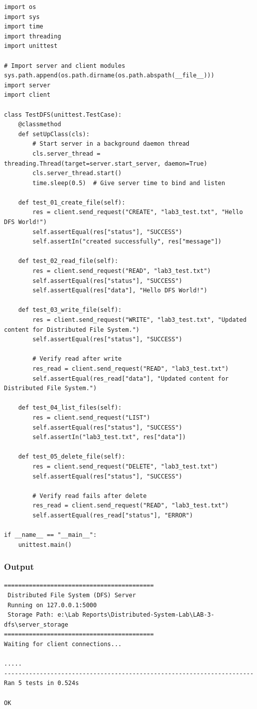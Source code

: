\documentclass[main]{subfiles}
\begin{document}
\begin{verbatim}
import os
import sys
import time
import threading
import unittest

# Import server and client modules
sys.path.append(os.path.dirname(os.path.abspath(__file__)))
import server
import client

class TestDFS(unittest.TestCase):
    @classmethod
    def setUpClass(cls):
        # Start server in a background daemon thread
        cls.server_thread = threading.Thread(target=server.start_server, daemon=True)
        cls.server_thread.start()
        time.sleep(0.5)  # Give server time to bind and listen

    def test_01_create_file(self):
        res = client.send_request("CREATE", "lab3_test.txt", "Hello DFS World!")
        self.assertEqual(res["status"], "SUCCESS")
        self.assertIn("created successfully", res["message"])

    def test_02_read_file(self):
        res = client.send_request("READ", "lab3_test.txt")
        self.assertEqual(res["status"], "SUCCESS")
        self.assertEqual(res["data"], "Hello DFS World!")

    def test_03_write_file(self):
        res = client.send_request("WRITE", "lab3_test.txt", "Updated content for Distributed File System.")
        self.assertEqual(res["status"], "SUCCESS")
        
        # Verify read after write
        res_read = client.send_request("READ", "lab3_test.txt")
        self.assertEqual(res_read["data"], "Updated content for Distributed File System.")

    def test_04_list_files(self):
        res = client.send_request("LIST")
        self.assertEqual(res["status"], "SUCCESS")
        self.assertIn("lab3_test.txt", res["data"])

    def test_05_delete_file(self):
        res = client.send_request("DELETE", "lab3_test.txt")
        self.assertEqual(res["status"], "SUCCESS")

        # Verify read fails after delete
        res_read = client.send_request("READ", "lab3_test.txt")
        self.assertEqual(res_read["status"], "ERROR")

if __name__ == "__main__":
    unittest.main()
\end{verbatim}

\subsubsection*{Output}
\begin{verbatim}
==========================================
 Distributed File System (DFS) Server
 Running on 127.0.0.1:5000
 Storage Path: e:\Lab Reports\Distributed-System-Lab\LAB-3-dfs\server_storage
==========================================
Waiting for client connections...

.....
----------------------------------------------------------------------
Ran 5 tests in 0.524s

OK
\end{verbatim}
\end{document}
